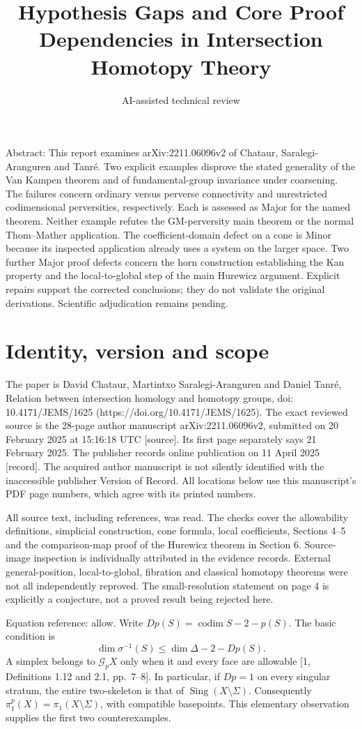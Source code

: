 \documentclass[10pt]{article}
\title{Hypothesis Gaps and Core Proof Dependencies
in Intersection Homotopy Theory}
\author{AI-assisted technical review}
\date{}
\begin{document}
\maketitle
Abstract: This report examines arXiv:2211.06096v2 of Chataur, Saralegi-Aranguren and Tanré. Two explicit examples disprove the stated generality of the Van Kampen theorem and of fundamental-group invariance under coarsening. The failures concern ordinary versus perverse connectivity and unrestricted codimensional perversities, respectively. Each is assessed as Major for the named theorem. Neither example refutes the GM-perversity main theorem or the normal Thom–Mather application. The coefficient-domain defect on a cone is Minor because its inspected application already uses a system on the larger space. Two further Major proof defects concern the horn construction establishing the Kan property and the local-to-global step of the main Hurewicz argument. Explicit repairs support the corrected conclusions; they do not validate the original derivations. Scientific adjudication remains pending.\par
\section*{Identity, version and scope}
The paper is David Chataur, Martintxo Saralegi-Aranguren and Daniel Tanré, Relation between intersection homology and homotopy groups, doi: 10.4171/JEMS/1625 (https://doi.org/10.4171/JEMS/1625). The exact reviewed source is the 28-page author manuscript arXiv:2211.06096v2, submitted on 20 February 2025 at 15:16:18 UTC [source]. Its first page separately says 21 February 2025. The publisher records online publication on 11 April 2025 [record]. The acquired author manuscript is not silently identified with the inaccessible publisher Version of Record. All locations below use this manuscript’s PDF page numbers, which agree with its printed numbers.\par
All source text, including references, was read. The checks cover the allowability definitions, simplicial construction, cone formula, local coefficients, Sections 4–5 and the comparison-map proof of the Hurewicz theorem in Section 6. Source-image inspection is individually attributed in the evidence records. External general-position, local-to-global, fibration and classical homotopy theorems were not all independently reproved. The small-resolution statement on page 4 is explicitly a conjecture, not a proved result being rejected here.\par
Equation reference: allow. Write \(Dp(S)=\operatorname{codim}S-2-p(S)\). The basic condition is \[
 \dim\sigma^{-1}(S)\leq \dim\Delta-2-Dp(S).\] A simplex belongs to \(\mathcal G_pX\) only when it and every face are allowable [1, Definitions 1.12 and 2.1, pp. 7–8]. In particular, if \(Dp=1\) on every singular stratum, the entire two-skeleton is that of \(\operatorname{Sing}(X\setminus\Sigma)\). Consequently \(\pi_1^p(X)=\pi_1(X\setminus\Sigma)\), with compatible basepoints. This elementary observation supplies the first two counterexamples.\par
\end{document}
